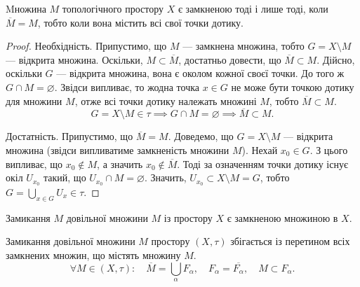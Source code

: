 \documentclass[a4paper, 12pt]{article}
\renewcommand{\emptyset}{\varnothing}
\begin{document}
\begin{theorem}
	Mножина $M$
	топологічного простору $X$ є замкненою тоді і лише тоді,
	коли $\overline{M} = M$, тобто коли вона містить всі свої точки
	дотику.
\end{theorem}

\begin{proof}
	Необхідність. Припустимо, що $M$ --- замкнена
	множина, тобто $G = X \setminus M$ --- відкрита множина. Оскільки,
	$M \subset \overline{M}$, достатньо довести, що $\overline{M} \subset M$. Дійсно, оскільки $G$ --- відкрита множина, вона є околом кожної своєї точки.
	До того ж $G \cap M = \emptyset$. Звідси випливає, то жодна точка
	$x \in G$ не може бути точкою дотику для множини $M$, отже
	всі точки дотику належать множині $M$, тобто $\overline{M} \subset M$. \[ G = X \setminus M \in \tau \implies G \cap M = \emptyset \implies \overline{M} \subset M. \]

	Достатність. Припустимо, що $\overline{M} = M$. Доведемо, що
	$G = X \setminus M$ --- відкрита множина (звідси випливатиме
	замкненість множини $M$). Нехай $x_0 \in G$. З цього випливає,
	що $x_0 \notin M$, а значить $x_0 \notin \overline{M}$. Тоді за означенням точки
	дотику існує окіл $U_{x_0}$ такий, що $U_{x_0} \cap M = \emptyset$. Значить,
	$U_{x_0} \subset X \setminus M = G$, тобто $G = \bigcup_{x \in G} U_x \in \tau$.
\end{proof}

\begin{corollary}
	Замикання $M$ довільної множини $M$ із
	простору $X$ є замкненою множиною в $X$.
\end{corollary}

\begin{theorem}
	Замикання довільної множини $M$ простору
	$(X, \tau)$ збігається із перетином всіх замкнених множин, що
	містять множину $M$. \[ \forall M \in (X, \tau): \quad \overline{M} = \bigcup_\alpha F_\alpha, \quad F_\alpha = \overline{F_\alpha}, \quad M \subset F_\alpha. \]
\end{theorem}
\end{document}
